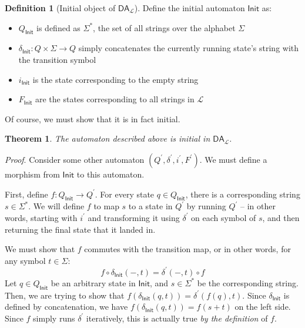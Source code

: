 \documentclass{article}
\theoremstyle{plain}
\newtheorem{theorem}{Theorem}
\theoremstyle{definition}
\newtheorem{definition}{Definition}
\begin{document}
\begin{definition}[Initial object of \ensuremath{{\mathsf{DA}}_{\mathcal{L}}}]
 Define the initial automaton \ensuremath{\mathsf{Init}} as: \begin{itemize}
\item \ensuremath{{Q}_{\mathsf{Init}}} is defined as \ensuremath{{\Sigma }^{\ast }}, the set of all strings over the alphabet \ensuremath{\Sigma}
\item \ensuremath{{\delta }_{\mathsf{Init}} : Q \times \Sigma \rightarrow Q} simply concatenates the currently running state's string with the transition symbol
\item \ensuremath{{i}_{\mathsf{Init}}} is the state corresponding to the empty string
\item \ensuremath{{F}_{\mathsf{Init}}} are the states corresponding to all strings in \ensuremath{\mathcal{L}}
\end{itemize}

\end{definition}


Of course, we must show that it is in fact initial.

\begin{theorem}
The automaton described above is initial in \ensuremath{{\mathsf{DA}}_{\mathcal{L}}}.
\end{theorem}


\emph{Proof}.  Consider some other automaton \ensuremath{\left( {Q}^{'}, {\delta }^{'}, {i}^{'}, {F}^{'} \right)}. We must define a morphism from \ensuremath{\mathsf{Init}} to this automaton.

First, define \ensuremath{f : {Q}_{\mathsf{Init}} \rightarrow {Q}^{'}}. For every state \ensuremath{q \in {Q}_{\mathsf{Init}}}, there is a corresponding string \ensuremath{s \in {\Sigma }^{\ast }}. We will define \ensuremath{f} to map \ensuremath{s} to a state in \ensuremath{{Q}^{'}} by running \ensuremath{{Q}^{'}} -- in other words, starting with \ensuremath{{i}^{'}} and transforming it using \ensuremath{{\delta }^{'}} on each symbol of \ensuremath{s}, and then returning the final state that it landed in.

We must show that \ensuremath{f} commutes with the transition map, or in other words, for any symbol \ensuremath{t \in \Sigma}: \[
f \circ {\delta }_{\mathsf{Init}} \left( -, t \right) = {\delta }^{'} \left( -, t \right) \circ f
\] Let \ensuremath{q \in {Q}_{\mathsf{Init}}} be an arbitrary state in \ensuremath{\mathsf{Init}}, and \ensuremath{s \in {\Sigma }^{\ast }} be the corresponding string. Then, we are trying to show that \ensuremath{f\left( {\delta }_{\mathsf{Init}} \left( q, t \right) \right) = {\delta }^{'}\left( f\left( q \right), t \right)}. Since \ensuremath{{\delta }_{\mathsf{Init}}} is defined by concatenation, we have \ensuremath{f\left( {\delta }_{\mathsf{Init}} \left( q, t \right) \right) = f\left( s + t \right)} on the left side. Since \ensuremath{f} simply runs \ensuremath{{\delta }^{'}} iteratively, this is actually true \emph{by the definition} of \ensuremath{f}.
\end{document}
